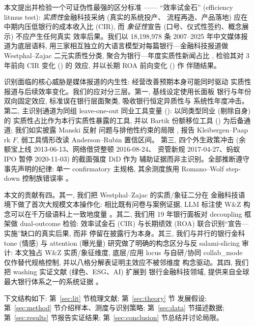 本文提出并检验一个可证伪性最强的区分标准 —— ``效率试金石''
(efficiency litmus test): \emph{实质性}金融科技采纳 (真实的系统投产、
流程再造、产品落地) 应在中期内压低银行的成本收入比 (CIR), 而
\emph{象征性}宣告 (口号、仪式性签约、概念展示) 不应产生任何真实
效率后果。我们以 18{,}198{,}978 条 2007--2025 年中文媒体报道为底层语料,
用三家相互独立的大语言模型对每篇银行—金融科技报道做 Westphal--Zajac
二元实质性分类, 聚合为银行—年度实质性新闻占比 ,
检验其对 3 年前向 CIR 变化 () 的
效应, 并以长期 ROA 前向变化 () 作
伴随结果。

识别面临的核心威胁是媒体报道的内生性: 经营改善预期本身可能同时驱动
实质性报道与后续效率变化。我们的应对分三层。第一, 基线设定使用长面板
银行与年份双向固定效应, 标准误在银行层面聚类, 吸收银行恒定异质性与
系统性年度冲击。第二, 主识别通道为同组 leave-one-out 同业工具变量
(): 以同类型同业 (剔除自身) 的
实质性占比作为本行实质性暴露的工具, 并以 Bartik 份额移位工具
() 为后备通道; 我们如实披露 Manski 反射
问题与排他性约束的局限 \parencite{manski1993reflection,learyroberts2014peer},
报告 Kleibergen--Paap rk $F$, 弱工具情形改读 Anderson--Rubin 置信区间。
第三, 四个外生政策冲击 (余额宝上线 2013-06-13、网络借贷整顿 2016-08-24、
资管新规 2017-04-27、蚂蚁 IPO 暂停 2020-11-03) 的截面强度 DiD 作为
辅助证据而非主识别。全部推断遵守事先声明的纪律: 单一 confirmatory
主规格, 其余测度族用 Romano--Wolf step-down 控制族错误率
\parencite{romanowolf2005stepwise}。

本文的贡献有四。其一, 我们把 Westphal--Zajac 的实质/象征二分在
金融科技语境下做了首次大规模文本操作化: 相比既有问卷与案例证据,
LLM 标注使 W\&Z 构念可以在千万级语料上一致地度量
\parencite{gilardi2023chatgpt,carlsonburbano2026llm}。其二, 我们用
19 年银行面板对 decoupling 框架做 dual-outcome 检验: 效率试金石
(CIR) 与长期绩效 (ROA) 联合识别``宣告—实施''缺口的真实后果, 而非
停留在披露行为本身。其三, 我们与并行的银行金科 tone (情感) 与
attention (曝光量) 研究做了明确的构念区分与反 salami-slicing 审计:
本文独占 W\&Z 实质/象征维度, 底层/应用 locus 与自研/协同
collab\_mode 仅作替代规格控制, 并以八格分解表证明主效应不被邻维度
构念驱动。其四, 我们把 washing 实证文献 (绿色、ESG、AI) 扩展到
银行金融科技领域, 提供来自全球最大银行体系之一的系统证据
\parencite{giannetti2026glossy,song2026aiwashing}。

下文结构如下: 第~\ref{sec:lit} 节梳理文献; 第~\ref{sec:theory} 节
发展假设; 第~\ref{sec:method} 节介绍样本、测度与识别策略;
第~\ref{sec:data} 节描述数据; 第~\ref{sec:results} 节报告实证结果;
第~\ref{sec:conclusion} 节总结并讨论局限。

